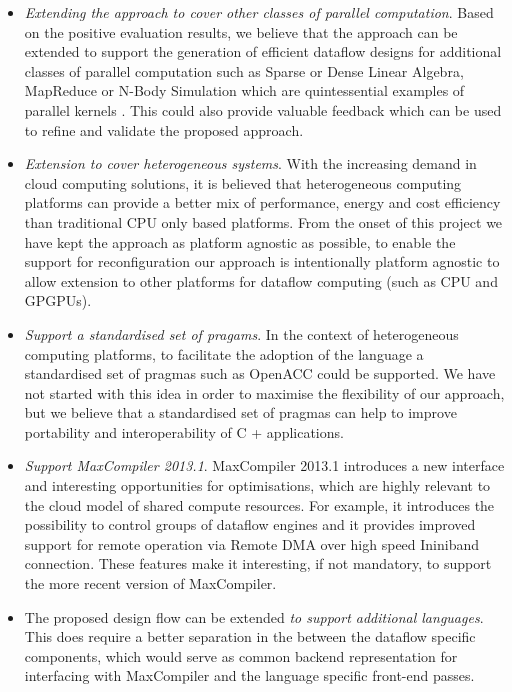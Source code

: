 \begin{itemize}
\item \emph{Extending the approach to cover other classes of parallel
    computation}.  Based on the positive evaluation results, we
  believe that the approach can be extended to support the generation
  of efficient dataflow designs for additional classes of parallel
  computation such as Sparse or Dense Linear Algebra, MapReduce or
  N-Body Simulation which are quintessential examples of parallel
  kernels
  \cite{Asanovic:Bodik:Catanzaro:Gebis:Husbands:Keutzer:Patterson:Plishker:Shalf:Williams:Yelick:2006}. This
  could also provide valuable feedback which can be used to refine and
  validate the proposed approach.


\item \emph{Extension to cover heterogeneous systems}. With the
  increasing demand in cloud computing solutions, it is believed that
  heterogeneous computing platforms can provide a better mix of
  performance, energy and cost efficiency than traditional CPU only
  based platforms. From the onset of this project we have kept the
  approach as platform agnostic as possible, to enable the support for
  reconfiguration our approach is intentionally platform agnostic to
  allow extension to other platforms for dataflow computing (such as
  CPU and GPGPUs).

\item \emph{Support a standardised set of pragams}. In the context of
  heterogeneous computing platforms, to facilitate the adoption of the
  \FAST{} language a standardised set of pragmas such as OpenACC could
  be supported. We have not started with this idea in order to
  maximise the flexibility of our approach, but we believe that a
  standardised set of pragmas can help to improve portability and
  interoperability of C + \FAST{} applications.

\item \emph{Support MaxCompiler 2013.1}. MaxCompiler 2013.1 introduces
  a new interface and interesting opportunities for optimisations,
  which are highly relevant to the cloud model of shared compute
  resources. For example, it introduces the possibility to control
  groups of dataflow engines and it provides improved support for
  remote operation via Remote DMA over high speed Ininiband
  connection. These features make it interesting, if not mandatory, to
  support the more recent version of MaxCompiler.


\item The proposed design flow can be extended \emph{to support
    additional languages}. This does require a better separation in
  the \fastc{} between the dataflow specific components, which would
  serve as common backend representation for interfacing with
  MaxCompiler and the language specific front-end passes.


\end{itemize}
